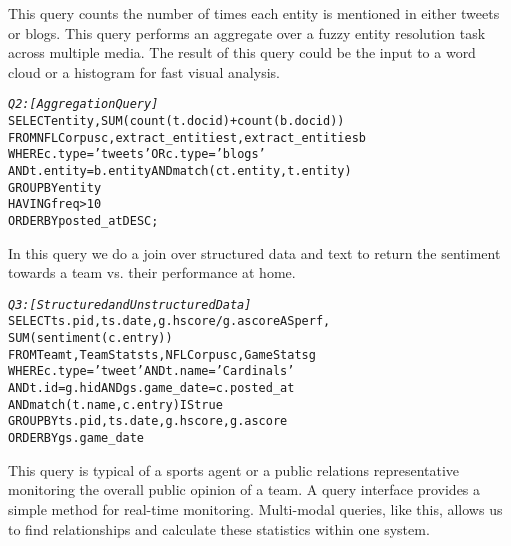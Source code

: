 This query counts the number of times each entity is mentioned in either tweets
or blogs. This query performs an aggregate over a fuzzy entity resolution
task across multiple media. The result of this query could be the input to a
word cloud or a histogram for fast visual analysis.
\begin{small}
\begin{alltt}
\textit{Q2: [Aggregation Query]}
SELECT entity, SUM(count(t.docid) + count(b.docid))
FROM NFLCorpus c, extract_entities t, extract_entities b
WHERE c.type = 'tweets' OR c.type = 'blogs' 
  AND t.entity = b.entity AND match(ct.entity, t.entity)
GROUP BY entity
HAVING freq > 10
ORDER BY posted_at DESC;
\end{alltt}
\end{small}

In this query we do a join over structured data and text to return the
sentiment towards a team vs. their performance at home. 
\begin{small}
\begin{alltt}
\textit{Q3: [Structured and Unstructured Data]}
SELECT ts.pid, ts.date, g.hscore / g.ascore AS perf,
  SUM(sentiment(c.entry))
FROM Team t, TeamStats ts, NFLCorpus c, GameStats g
WHERE c.type = 'tweet' AND t.name = 'Cardinals' 
  AND t.id = g.hid AND gs.game_date = c.posted_at 
  AND match(t.name,c.entry) IS true
GROUP BY ts.pid, ts.date, g.hscore, g.ascore
ORDER BY gs.game_date
\end{alltt}
\end{small}


This query is typical of a sports agent or a public relations representative
monitoring the overall public opinion of a team. A query interface provides a
simple method for real-time monitoring. 
Multi-modal queries, like this, allows us to find relationships and calculate
these statistics within one system. 



